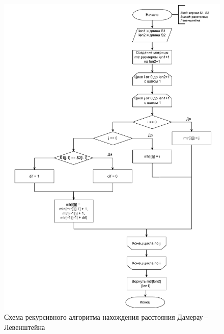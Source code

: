 \begin{figure}[h]
	\centering
	\includegraphics[height=0.9\textheight, page=3]{img/algorithms.pdf}
	\caption{Схема рекурсивного алгоритма нахождения расстояния Дамерау\,--\,Левенштейна}
	\label{fig:DLrec}
\end{figure}

\clearpage

